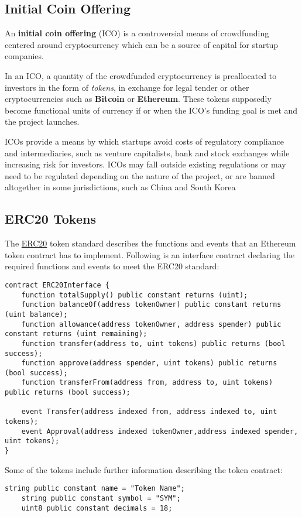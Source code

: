 \subsection{Initial Coin Offering}
An \textbf{initial coin offering} (ICO) is a controversial means of crowdfunding centered around cryptocurrency \cite{chohan2017initial,teutsch2017interactive} which can be a source of capital for startup companies. 

In an ICO, a quantity of the crowdfunded cryptocurrency is preallocated to investors in the form of \textit{tokens}, in exchange for legal tender or other cryptocurrencies such as \textbf{Bitcoin} or \textbf{Ethereum}. These tokens supposedly become functional units of currency if or when the ICO's funding goal is met and the project launches.

ICOs provide a means by which startups avoid costs of regulatory compliance and intermediaries, such as venture capitalists, bank and stock exchanges while increasing risk for investors. ICOs may fall outside existing regulations or may need to be regulated depending on the nature of the project, or are banned altogether in some jurisdictions, such as China and South Korea

\subsection{ERC20 Tokens}
The \href{https://github.com/ethereum/EIPs/blob/master/EIPS/eip-20.md}{ERC20} token standard \cite{vogelsteller2015erc} describes the functions and events that an Ethereum token contract has to implement. \newline
Following is an interface contract declaring the required functions and events to meet the ERC20 standard:
\begin{lstlisting}[language=Solidity]
contract ERC20Interface {
    function totalSupply() public constant returns (uint);
    function balanceOf(address tokenOwner) public constant returns (uint balance);
    function allowance(address tokenOwner, address spender) public constant returns (uint remaining);
    function transfer(address to, uint tokens) public returns (bool success);
    function approve(address spender, uint tokens) public returns (bool success);
    function transferFrom(address from, address to, uint tokens) public returns (bool success);

    event Transfer(address indexed from, address indexed to, uint tokens);
    event Approval(address indexed tokenOwner,address indexed spender, uint tokens);
}
\end{lstlisting}
Some of the tokens include further information describing the token contract:
\begin{lstlisting}[language=Solidity]
    string public constant name = "Token Name";
    string public constant symbol = "SYM";
    uint8 public constant decimals = 18;
\end{lstlisting}

